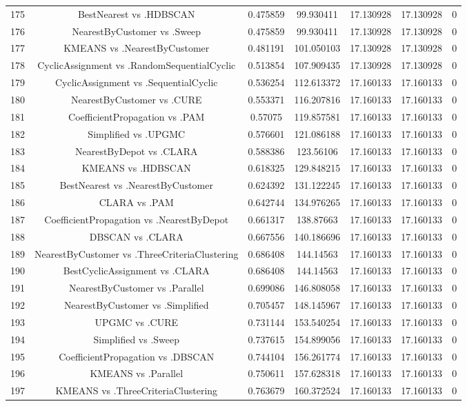 \documentclass[a4paper,10pt]{article}
\begin{document}
\begin{landscape}
\begin{table}[!htp]
\begin{tabular}{ccccccc}
175&BestNearest vs .HDBSCAN&0.475859&99.930411&17.130928&17.130928&0\\
176&NearestByCustomer vs .Sweep&0.475859&99.930411&17.130928&17.130928&0\\
177&KMEANS vs .NearestByCustomer&0.481191&101.050103&17.130928&17.130928&0\\
178&CyclicAssignment vs .RandomSequentialCyclic&0.513854&107.909435&17.130928&17.130928&0\\
179&CyclicAssignment vs .SequentialCyclic&0.536254&112.613372&17.160133&17.160133&0\\
180&NearestByCustomer vs .CURE&0.553371&116.207816&17.160133&17.160133&0\\
181&CoefficientPropagation vs .PAM&0.57075&119.857581&17.160133&17.160133&0\\
182&Simplified vs .UPGMC&0.576601&121.086188&17.160133&17.160133&0\\
183&NearestByDepot vs .CLARA&0.588386&123.56106&17.160133&17.160133&0\\
184&KMEANS vs .HDBSCAN&0.618325&129.848215&17.160133&17.160133&0\\
185&BestNearest vs .NearestByCustomer&0.624392&131.122245&17.160133&17.160133&0\\
186&CLARA vs .PAM&0.642744&134.976265&17.160133&17.160133&0\\
187&CoefficientPropagation vs .NearestByDepot&0.661317&138.87663&17.160133&17.160133&0\\
188&DBSCAN vs .CLARA&0.667556&140.186696&17.160133&17.160133&0\\
189&NearestByCustomer vs .ThreeCriteriaClustering&0.686408&144.14563&17.160133&17.160133&0\\
190&BestCyclicAssignment vs .CLARA&0.686408&144.14563&17.160133&17.160133&0\\
191&NearestByCustomer vs .Parallel&0.699086&146.808058&17.160133&17.160133&0\\
192&NearestByCustomer vs .Simplified&0.705457&148.145967&17.160133&17.160133&0\\
193&UPGMC vs .CURE&0.731144&153.540254&17.160133&17.160133&0\\
194&Simplified vs .Sweep&0.737615&154.899056&17.160133&17.160133&0\\
195&CoefficientPropagation vs .DBSCAN&0.744104&156.261774&17.160133&17.160133&0\\
196&KMEANS vs .Parallel&0.750611&157.628318&17.160133&17.160133&0\\
197&KMEANS vs .ThreeCriteriaClustering&0.763679&160.372524&17.160133&17.160133&0\\

\end{tabular}
\end{table}
\end{landscape}
\end{document}
